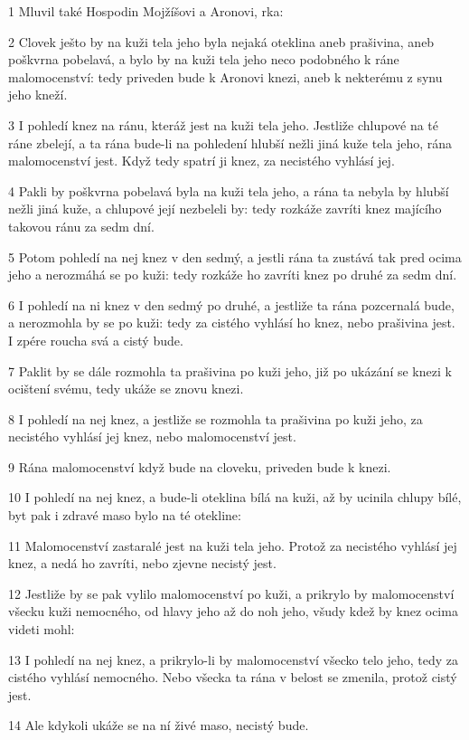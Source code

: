 \par 1 Mluvil také Hospodin Mojžíšovi a Aronovi, rka:
\par 2 Clovek ješto by na kuži tela jeho byla nejaká oteklina aneb prašivina, aneb poškvrna pobelavá, a bylo by na kuži tela jeho neco podobného k ráne malomocenství: tedy priveden bude k Aronovi knezi, aneb k nekterému z synu jeho kneží.
\par 3 I pohledí knez na ránu, kteráž jest na kuži tela jeho. Jestliže chlupové na té ráne zbelejí, a ta rána bude-li na pohledení hlubší nežli jiná kuže tela jeho, rána malomocenství jest. Když tedy spatrí ji knez, za necistého vyhlásí jej.
\par 4 Pakli by poškvrna pobelavá byla na kuži tela jeho, a rána ta nebyla by hlubší nežli jiná kuže, a chlupové její nezbeleli by: tedy rozkáže zavríti knez majícího takovou ránu za sedm dní.
\par 5 Potom pohledí na nej knez v den sedmý, a jestli rána ta zustává tak pred ocima jeho a nerozmáhá se po kuži: tedy rozkáže ho zavríti knez po druhé za sedm dní.
\par 6 I pohledí na ni knez v den sedmý po druhé, a jestliže ta rána pozcernalá bude, a nerozmohla by se po kuži: tedy za cistého vyhlásí ho knez, nebo prašivina jest. I zpére roucha svá a cistý bude.
\par 7 Paklit by se dále rozmohla ta prašivina po kuži jeho, již po ukázání se knezi k ocištení svému, tedy ukáže se znovu knezi.
\par 8 I pohledí na nej knez, a jestliže se rozmohla ta prašivina po kuži jeho, za necistého vyhlásí jej knez, nebo malomocenství jest.
\par 9 Rána malomocenství když bude na cloveku, priveden bude k knezi.
\par 10 I pohledí na nej knez, a bude-li oteklina bílá na kuži, až by ucinila chlupy bílé, byt pak i zdravé maso bylo na té otekline:
\par 11 Malomocenství zastaralé jest na kuži tela jeho. Protož za necistého vyhlásí jej knez, a nedá ho zavríti, nebo zjevne necistý jest.
\par 12 Jestliže by se pak vylilo malomocenství po kuži, a prikrylo by malomocenství všecku kuži nemocného, od hlavy jeho až do noh jeho, všudy kdež by knez ocima videti mohl:
\par 13 I pohledí na nej knez, a prikrylo-li by malomocenství všecko telo jeho, tedy za cistého vyhlásí nemocného. Nebo všecka ta rána v belost se zmenila, protož cistý jest.
\par 14 Ale kdykoli ukáže se na ní živé maso, necistý bude.
